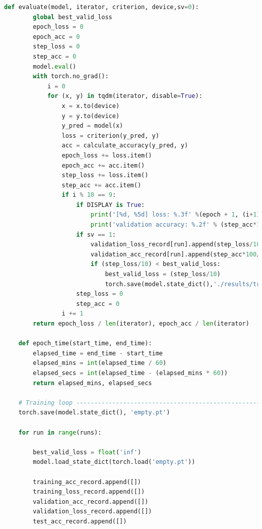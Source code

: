 \documentclass[3p,times,procedia]{elsarticle}
\begin{document}
\begin{lstlisting}[language=Python]
    def evaluate(model, iterator, criterion, device,sv=0):
        global best_valid_loss
        epoch_loss = 0
        epoch_acc = 0
        step_loss = 0
        step_acc = 0
        model.eval()
        with torch.no_grad():
            i = 0
            for (x, y) in tqdm(iterator, disable=True):
                x = x.to(device)
                y = y.to(device)
                y_pred = model(x)
                loss = criterion(y_pred, y)
                acc = calculate_accuracy(y_pred, y)
                epoch_loss += loss.item()
                epoch_acc += acc.item()
                step_loss += loss.item()
                step_acc += acc.item()
                if i % 10 == 9:
                    if DISPLAY is True:                                                      # print every 10 mini-batches
                        print('[%d, %5d] loss: %.3f' %(epoch + 1, (i+1), step_loss/10))    # each epoch has 5000/50 = 100 steps
                        print('validation accuracy: %.2f' % (step_acc*100/10) )          # printed at 10 step intervals
                    if sv == 1:
                        validation_loss_record[run].append(step_loss/10 )                        # save validation loss with 10 step intervals
                        validation_acc_record[run].append(step_acc*100/10 )                      # save validation accuracy with 10 step intervals
                        if (step_loss/10) < best_valid_loss:
                            best_valid_loss = (step_loss/10)
                            torch.save(model.state_dict(),'./results/trained_models/'+ model_name+'[' +str(run)+'].pt')
                    step_loss = 0
                    step_acc = 0
                i += 1
        return epoch_loss / len(iterator), epoch_acc / len(iterator)
    
    def epoch_time(start_time, end_time):
        elapsed_time = end_time - start_time
        elapsed_mins = int(elapsed_time / 60)
        elapsed_secs = int(elapsed_time - (elapsed_mins * 60))
        return elapsed_mins, elapsed_secs
    
    # Training loop -------------------------------------------------------------------#
    torch.save(model.state_dict(), 'empty.pt')
    
    for run in range(runs):
    
        best_valid_loss = float('inf')
        model.load_state_dict(torch.load('empty.pt'))
    
        training_acc_record.append([])
        training_loss_record.append([])
        validation_acc_record.append([])
        validation_loss_record.append([])
        test_acc_record.append([])
    

\end{lstlisting}
\end{document}
